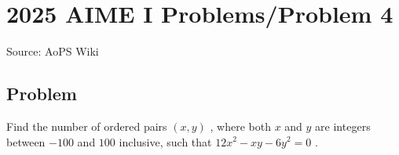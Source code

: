 \documentclass[12pt]{article}
\begin{document}
\section*{{2025 AIME I Problems/Problem 4}}
Source: AoPS Wiki

\subsection*{Problem}
Find the number of ordered pairs $(x,y)$ , where both $x$ and $y$ are integers between $-100$ and $100$ inclusive, such that $12x^2-xy-6y^2=0$ .
\end{document}
